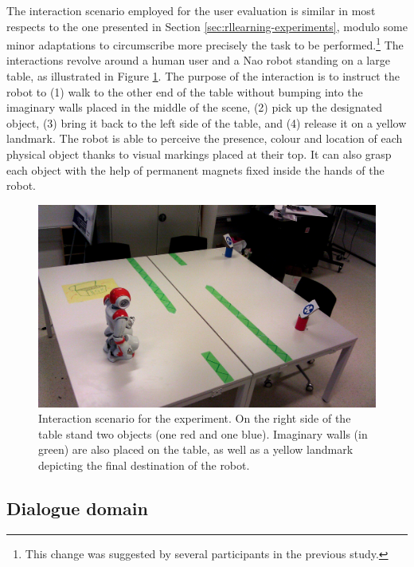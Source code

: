 The interaction scenario employed for the user evaluation is similar in most respects to the one presented in Section \ref{sec:rllearning-experiments}, modulo some minor adaptations to circumscribe more precisely the task to be performed.\footnote{This change was suggested by several participants in the previous study.} The interactions revolve around a human user and a Nao robot standing on a large table, as illustrated in Figure \ref{fig:scenario}.  The purpose of the interaction is to instruct the robot to (1) walk to the other end of the table without bumping into the imaginary walls placed in the middle of the scene, (2) pick up the designated object, (3) bring it back to the left side of the table, and (4) release it on a yellow landmark.  The robot is able to perceive the presence, colour and location of each physical object thanks to visual markings placed at their top.  It can also grasp each object with the help of permanent magnets fixed inside the hands of the robot. 

\begin{figure}[h]
\vspace{3mm}
\centering
\includegraphics[scale=0.13]{imgs/scenario.jpg} \vspace{3mm}
\caption{Interaction scenario for the experiment.  On the right side of the table stand two objects (one red and one blue).  Imaginary walls (in green) are also placed on the table, as well as a yellow landmark depicting the final destination of the robot. }
\label{fig:scenario}
\end{figure}


\subsection{Dialogue domain}

